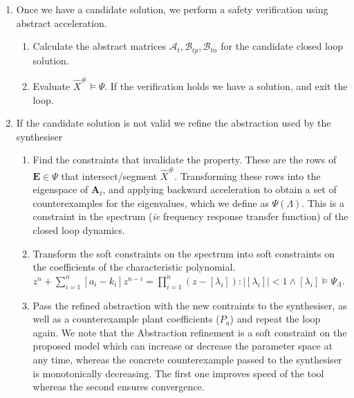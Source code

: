 \documentclass[runningheads,a4paper]{llncs}
\newcommand{\mat}[1]{\boldsymbol{#1}}
\begin{document}
\begin{enumerate}
\begin{enumerate}
\end{enumerate}
\item Once we have a candidate solution, we perform a safety verification using abstract acceleration.
\begin{enumerate}
\item Calculate the abstract matrices $\mathcal{A}_t, \mathcal{B}_{tp},\mathcal{B}_{tn}$ for the candidate closed loop solution.
\item Evaluate $\hat{X}^\# \models \Psi$. If the verification holds we have a solution, and exit the loop.
\end{enumerate} 
\item If the candidate solution is not valid we refine the abstraction used by the synthesiser
\begin{enumerate}
\item Find the constraints that invalidate the property. These are the rows of $\mat{E} \in \Psi$ that intersect/segment $\hat{X}^\#$. Transforming these rows into the eigenspace of $\mat{A}_t$, and applying backward acceleration to obtain a set of counterexamples for the eigenvalues, which we define as $\Psi(\Lambda)$. This is a constraint in the spectrum (\emph{ie} frequency response transfer function) of the closed loop dynamics. 
\item Transform the soft constraints on the spectrum into soft constraints on the coefficients of the characteristic polynomial. 
$z^n+\sum_{i=1}^n[a_i-k_i]z^{n-i}=\prod_{i=1}^n (z-[\lambda_i]) : |[\lambda_i]|<1 \wedge [\lambda_i] \models \Psi_{\Lambda}$.
\item Pass the refined abstraction with the new contraints to the synthesiser, as well as a counterexample plant coefficients ($P_a$) and repeat the loop again. We note that the Abstraction refinement is a soft constraint on the proposed model which can increase or decrease the parameter space at any time, whereas the concrete counterexample passed to the synthesiser is monotonically decreasing. The first one improves speed of the tool whereas the second ensures convergence.

\end{enumerate} 
\end{enumerate}
\end{document}
